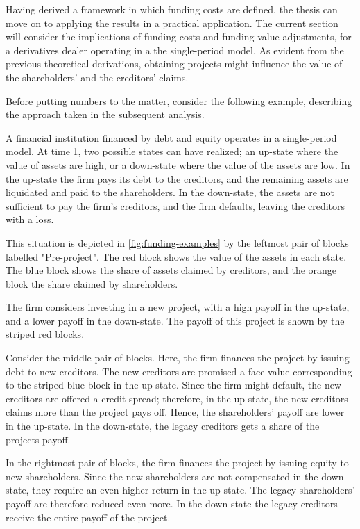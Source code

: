 \documentclass[main.tex]{subfiles}
\begin{document}
    Having derived a framework in which funding costs are defined, 
    the thesis can move on to applying the results in a practical application.
    The current section will consider the implications of funding costs and funding value adjustments,
    for a derivatives dealer operating in a the single-period model.
    As evident from the previous theoretical derivations, 
    obtaining projects might influence the value of the shareholders' and the creditors' claims.

    Before putting numbers to the matter, consider the following example,
    describing the approach taken in the subsequent analysis.

    \begin{example}
    
    A financial institution financed by debt and equity operates in a single-period model.
    At time 1, two possible states can have realized;
    an up-state where the value of assets are high,
    or a down-state where the value of the assets are low.
    In the up-state the firm pays its debt to the creditors,
    and the remaining assets are liquidated and paid to the shareholders.
    In the down-state, the assets are not sufficient to pay the firm's creditors, 
    and the firm defaults, leaving the creditors with a loss. 

    This situation is depicted in \cref{fig:funding-examples} 
    by the leftmost pair of blocks labelled "Pre-project". 
    The \textcolor{wtf-red}{red block} shows the value of the assets in each state.
    The \textcolor{wtf-blue}{blue block} shows the share of assets claimed by creditors,
    and the \textcolor{wtf-orange}{orange block} the share claimed by shareholders.

    The firm considers investing in a new project, with a high payoff in the up-state,
    and a lower payoff in the down-state.
    The payoff of this project is shown by the striped red blocks.

    Consider the middle pair of blocks.
    Here, the firm finances the project by issuing debt to new creditors.
    The new creditors are promised a face value 
    corresponding to the striped blue block in the up-state.
    Since the firm might default, the new creditors are offered a credit spread;
    therefore, in the up-state, the new creditors claims more than the project pays off.
    Hence, the shareholders' payoff are lower in the up-state. 
    In the down-state, the legacy creditors gets a share of the projects payoff.

    In the rightmost pair of blocks,
    the firm finances the project by issuing equity to new shareholders.
    Since the new shareholders are not compensated in the down-state,
    they require an even higher return in the up-state.
    The legacy shareholders' payoff are therefore reduced even more.
    In the down-state the legacy creditors receive the entire payoff of the project.
    

    \end{example}
\end{document}
